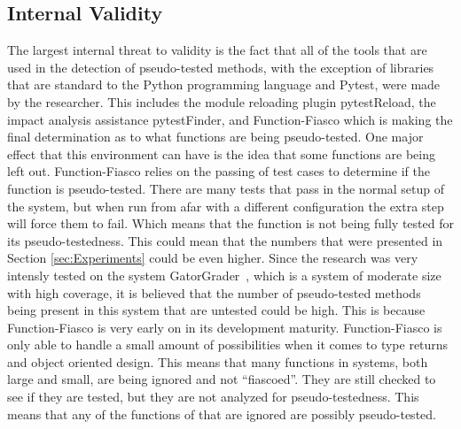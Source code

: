 \subsection{Internal Validity}

The largest internal threat to validity is the fact that all of the tools that are used in the detection of pseudo-tested methods, with the exception of libraries that are standard to the Python programming language and Pytest, were made by the researcher. This includes the module reloading plugin pytestReload, the impact analysis assistance pytestFinder, and Function-Fiasco which is making the final determination as to what functions are being pseudo-tested. One major effect that this environment can have is the idea that some functions are being left out. Function-Fiasco relies on the passing of test cases to determine if the function is pseudo-tested. There are many tests that pass in the normal setup of the system, but when run from afar with a different configuration the extra step will force them to fail. Which means that the function is not being fully tested for its pseudo-testedness. This could mean that the numbers that were presented in Section \ref{sec:Experiments} could be even higher. Since the research was very intensly tested on the system GatorGrader~\cite{Gat}, which is a system of moderate size with high coverage, it is believed that the number of pseudo-tested methods being present in this system that are untested could be high. This is because Function-Fiasco is very early on in its development maturity. Function-Fiasco is only able to handle a small amount of possibilities when it comes to type returns and object oriented design. This means that many functions in systems, both large and small, are being ignored and not ``fiascoed''. They are still checked to see if they are tested, but they are not analyzed for pseudo-testedness. This means that any of the functions of that are ignored are possibly pseudo-tested.



